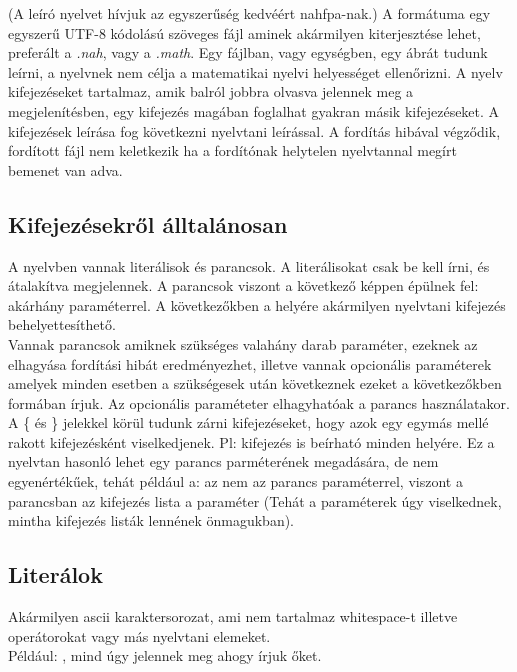 \documentclass[../spec.tex]{subfiles}
\begin{document}
    (A leíró nyelvet hívjuk az egyszerűség kedvéért nahfpa-nak.)
    A formátuma egy egyszerű UTF-8 kódolású szöveges fájl aminek akármilyen kiterjesztése lehet, preferált a \textit{.nah}, vagy a \textit{.math}.
    Egy fájlban, vagy egységben, egy ábrát tudunk leírni, a nyelvnek nem célja a matematikai nyelvi helyességet ellenőrizni.
    A nyelv kifejezéseket tartalmaz, amik balról jobbra olvasva jelennek meg a megjelenítésben, egy kifejezés magában foglalhat gyakran másik kifejezéseket.
    A kifejezések leírása fog következni nyelvtani leírással.
    A fordítás hibával végződik, fordított fájl nem keletkezik ha a fordítónak helytelen nyelvtannal megírt bemenet van adva.

    \subsection{Kifejezésekről álltalánosan}\label{subsec:kifejezésekből-álltalánosan}
    A nyelvben vannak literálisok és parancsok.
    A literálisokat csak be kell írni, és átalakítva megjelennek.
    A parancsok viszont a következő képpen épülnek fel:  akárhány paraméterrel.
    A következőkben a \lang{[kif]} helyére akármilyen nyelvtani kifejezés behelyettesíthető.\\
    Vannak parancsok amiknek szükséges valahány darab paraméter, ezeknek az elhagyása fordítási hibát eredményezhet, illetve vannak opcionális paraméterek amelyek minden esetben
    a szükségesek után következnek ezeket a következőkben \lang{[?paraméter]} formában írjuk.
    Az opcionális paraméteter elhagyhatóak a parancs használatakor.\\
    A \{ és \} jelekkel körül tudunk zárni kifejezéseket, hogy azok egy egymás mellé rakott kifejezésként viselkedjenek.
    Pl:  kifejezés is beírható minden \lang{[kif]} helyére.
    Ez a nyelvtan hasonló lehet egy parancs parméterének megadására, de nem egyenértékűek, tehát például a:  az nem az  parancs  paraméterrel,
    viszont a  parancsban az  kifejezés lista a paraméter (Tehát a paraméterek úgy viselkednek, mintha kifejezés listák lennének önmagukban).

    \subsection{Literálok}\label{subsec:szám-literálok}
    Akármilyen ascii karaktersorozat, ami nem tartalmaz whitespace-t illetve operátorokat vagy más nyelvtani elemeket.\\
    Például: ,  mind úgy jelennek meg ahogy írjuk őket.
\end{document}
